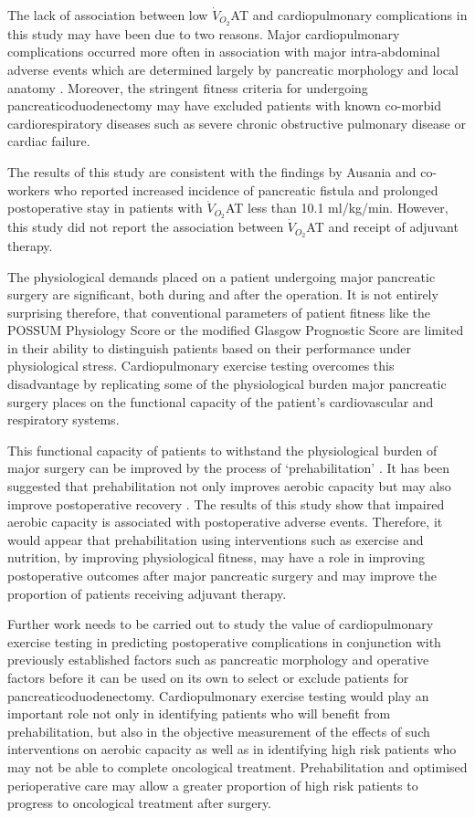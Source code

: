 The lack of association between low $\dot{V}_{O_2}$AT and cardiopulmonary complications in this study may have been due to two reasons. 
Major cardiopulmonary complications occurred more often in association with major intra-abdominal adverse events which are determined largely by pancreatic morphology and local anatomy \parencite{braga_prognostic_2011}. 
Moreover, the stringent fitness criteria for undergoing pancreaticoduodenectomy may have excluded patients with known co-morbid cardiorespiratory diseases such as severe chronic obstructive pulmonary disease or cardiac failure.

The results of this study are consistent with the findings by Ausania and co-workers \parencite{ausania_effects_2012} who reported increased incidence of pancreatic fistula and prolonged postoperative stay in patients with $\dot{V}_{O_2}$AT less than 10.1 ml/kg/min. 
However, this study did not report the association between $\dot{V}_{O_2}$AT and receipt of adjuvant therapy.

The physiological demands placed on a patient undergoing major pancreatic surgery are significant, both during and after the operation. 
It is not entirely surprising therefore, that conventional parameters of patient fitness like the POSSUM Physiology Score or the modified Glasgow Prognostic Score are limited in their ability to distinguish patients based on their performance under physiological stress. 
Cardiopulmonary exercise testing overcomes this disadvantage by replicating some of the physiological burden major pancreatic surgery places on the functional capacity of the patient's cardiovascular and respiratory systems.

This functional capacity of patients to withstand the physiological burden of major surgery can be improved by the process of `prehabilitation' \parencite{topp_effect_2002}. 
It has been suggested that prehabilitation not only improves aerobic capacity \parencite{jones_effects_2007} but may also improve postoperative recovery \parencite{mayo_impact_2011, pehlivan_effects_2011}. 
The results of this study show that impaired aerobic capacity is associated with postoperative adverse events. 
Therefore, it would appear that prehabilitation using interventions such as exercise and nutrition, by improving physiological fitness, may have a role in improving postoperative outcomes after major pancreatic surgery and may improve the proportion of patients receiving adjuvant therapy.

Further work needs to be carried out to study the value of cardiopulmonary exercise testing in predicting postoperative complications in conjunction with previously established factors such as pancreatic morphology and operative factors before it can be used on its own to select or exclude patients for pancreaticoduodenectomy. 
Cardiopulmonary exercise testing would play an important role not only in identifying patients who will benefit from prehabilitation, but also in the objective measurement of the effects of such interventions on aerobic capacity as well as in identifying high risk patients who may not be able to complete oncological treatment. 
Prehabilitation and optimised perioperative care may allow a greater proportion of high risk patients to progress to oncological treatment after surgery.
